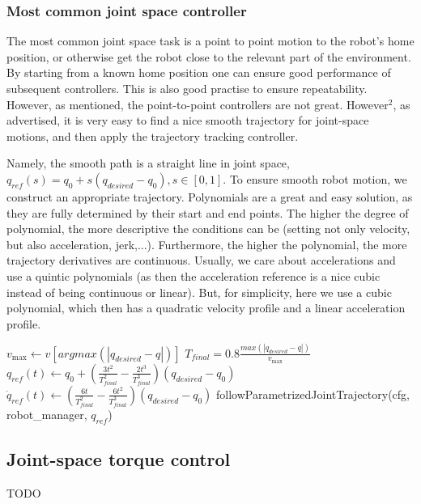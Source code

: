 \subsubsection{Most common joint space controller}
The most common joint space task is a point to point motion
to the robot's home position, or otherwise get the robot
close to the relevant part of the environment. 
By starting from a known home position
one can ensure good performance of subsequent controllers.
This is also good practise to ensure repeatability.
However, as mentioned, the point-to-point controllers are not great.
However$^2$, as advertised, it is very easy to find a nice smooth
trajectory for joint-space motions,
and then apply the trajectory tracking controller.

Namely, the smooth path is a straight line in joint space,
$q_{ref}(s) = q_0 + s(q_{desired} - q_0), s \in [0,1]$.
To ensure smooth robot motion, we construct an appropriate 
trajectory. Polynomials are a great and easy solution,
as they are fully determined by their start and end points.
The higher the degree of polynomial, the more descriptive
the conditions can be (setting not only velocity, but also
acceleration, jerk,...). Furthermore, the higher the polynomial,
the more trajectory derivatives are continuous.
Usually, we care about accelerations and use a quintic polynomials
(as then the acceleration reference is a nice cubic instead of
being continuous or linear).
But, for simplicity, here we use a cubic polynomial,
which then has a quadratic velocity profile and a linear acceleration
profile.


\begin{algorithm}[H]
\caption{moveJWTraj}
\begin{algorithmic}[1] %
\State $ v_{\max} \gets v[argmax(|q_{desired} - q |)] $
\State $T_{final} = 0.8\frac{max(|q_{desired} - q |)}{v_{\max}} $
\State $q_{ref}(t) \gets q_0 + \left( \frac{3t^2}{T_{final}^2} - \frac{2t^3}{T_{final}^3} \right) (q_{desired} - q_0)$
\State $\dot{q}_{ref}(t) \gets \left( \frac{6t}{T_{final}^2} - \frac{6t^2}{T_{final}^3} \right) (q_{desired} - q_0)$
\State followParametrizedJointTrajectory(cfg, robot\_manager, $q_{ref}$)
\EndProcedure
\end{algorithmic}
\label{algo-movejwtraj}
\end{algorithm}

\subsection{Joint-space torque control}
TODO
